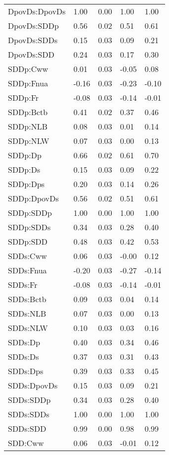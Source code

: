 \begin{center}
\begin{longtable}{|p{0.9in}|p{0.7in}|p{0.7in}|p{0.7in}|p{0.7in}|}
  DpovDs:DpovDs & 1.00 & 0.00 & 1.00 & 1.00 \\ 
  DpovDs:SDDp & 0.56 & 0.02 & 0.51 & 0.61 \\ 
  DpovDs:SDDs & 0.15 & 0.03 & 0.09 & 0.21 \\ 
  DpovDs:SDD & 0.24 & 0.03 & 0.17 & 0.30 \\ 
  SDDp:Cww & 0.01 & 0.03 & -0.05 & 0.08 \\ 
  SDDp:Fnua & -0.16 & 0.03 & -0.23 & -0.10 \\ 
  SDDp:Fr & -0.08 & 0.03 & -0.14 & -0.01 \\ 
  SDDp:Bctb & 0.41 & 0.02 & 0.37 & 0.46 \\ 
  SDDp:NLB & 0.08 & 0.03 & 0.01 & 0.14 \\ 
  SDDp:NLW & 0.07 & 0.03 & 0.00 & 0.13 \\ 
  SDDp:Dp & 0.66 & 0.02 & 0.61 & 0.70 \\ 
  SDDp:Ds & 0.15 & 0.03 & 0.09 & 0.22 \\ 
  SDDp:Dps & 0.20 & 0.03 & 0.14 & 0.26 \\ 
  SDDp:DpovDs & 0.56 & 0.02 & 0.51 & 0.61 \\ 
  SDDp:SDDp & 1.00 & 0.00 & 1.00 & 1.00 \\ 
  SDDp:SDDs & 0.34 & 0.03 & 0.28 & 0.40 \\ 
  SDDp:SDD & 0.48 & 0.03 & 0.42 & 0.53 \\ 
  SDDs:Cww & 0.06 & 0.03 & -0.00 & 0.12 \\ 
  SDDs:Fnua & -0.20 & 0.03 & -0.27 & -0.14 \\ 
  SDDs:Fr & -0.08 & 0.03 & -0.14 & -0.01 \\ 
  SDDs:Bctb & 0.09 & 0.03 & 0.04 & 0.14 \\ 
  SDDs:NLB & 0.07 & 0.03 & 0.00 & 0.13 \\ 
  SDDs:NLW & 0.10 & 0.03 & 0.03 & 0.16 \\ 
  SDDs:Dp & 0.40 & 0.03 & 0.34 & 0.46 \\ 
  SDDs:Ds & 0.37 & 0.03 & 0.31 & 0.43 \\ 
  SDDs:Dps & 0.39 & 0.03 & 0.33 & 0.45 \\ 
  SDDs:DpovDs & 0.15 & 0.03 & 0.09 & 0.21 \\ 
  SDDs:SDDp & 0.34 & 0.03 & 0.28 & 0.40 \\ 
  SDDs:SDDs & 1.00 & 0.00 & 1.00 & 1.00 \\ 
  SDDs:SDD & 0.99 & 0.00 & 0.98 & 0.99 \\ 
  SDD:Cww & 0.06 & 0.03 & -0.01 & 0.12 \\ 

\end{longtable}
\end{center}
